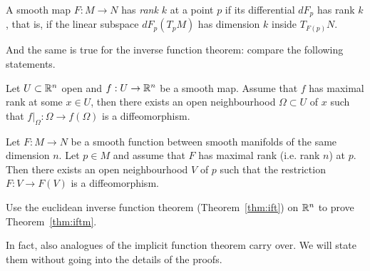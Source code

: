 \begin{definition}
  A smooth map $F:M\to N$ has \emph{rank $k$} at a point $p$ if its differential $dF_p$ has rank $k$, that is, if the linear subspace $dF_p(T_pM)$ has dimension $k$ inside $T_{F(p)}N$.
\end{definition}

And the same is true for the inverse function theorem:
compare the following statements.

\begin{theorem}\label{thm:ift}
  Let $U\subset\mathbb{R}^n$ open and $f:U \to \mathbb{R}^n$ be a smooth map.
  Assume that $f$ has maximal rank at some $x\in U$, then there exists an open neighbourhood $\Omega\subset U$ of $x$ such that  $f\big|_\Omega : \Omega \to f(\Omega)$ is a diffeomorphism.
\end{theorem}

\begin{theorem}\label{thm:iftm}
  Let $F:M\to N$ be a smooth function between smooth manifolds of the same dimension $n$.
  Let $p\in M$ and assume that $F$ has maximal rank (i.e. rank $n$) at $p$.
  Then there exists an open neighbourhood $V$ of $p$ such that the restriction $F:V\to F(V)$ is a diffeomorphism.
\end{theorem}
\begin{exercise}
  Use the euclidean inverse function theorem (Theorem~\ref{thm:ift}) on $\mathbb{R}^n$ to prove Theorem~\ref{thm:iftm}.
\end{exercise}


In fact, also analogues of the implicit function theorem carry over.
We will state them without going into the details of the proofs.

